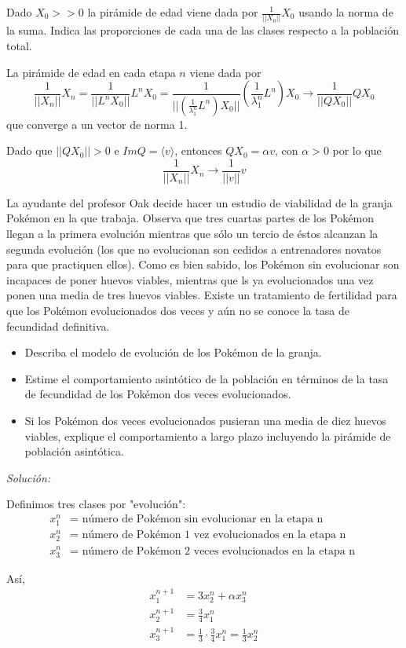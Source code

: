     Dado $X_0 >> 0$ la pirámide de edad viene dada por $\frac{1}{||X_0||}X_0$ usando la norma de la suma. Indica las proporciones de cada una de las clases respecto a la población total.

    La pirámide de edad en cada etapa $n$ viene dada por $$\frac{1}{||X_n||}X_n = \frac{1}{||L^nX_0||}L^nX_0 = \frac{1}{||(\frac{1}{\lambda_1^n}L^n)X_0||}\left(\frac{1}{\lambda_1^n}L^n\right)X_0\rightarrow \frac{1}{||QX_0||}QX_0$$ que converge a un vector de norma 1.

    Dado que $||QX_0|| > 0$ e $Im Q = \langle v \rangle$, entonces $QX_0 = \alpha v$, con $\alpha >0$ por lo que $$\frac{1}{||X_n||}X_n \rightarrow \frac{1}{||v||}v$$


    \begin{ejemplo}
        La ayudante del profesor Oak decide hacer un estudio de viabilidad de la granja Pokémon en la que trabaja. Observa que tres cuartas partes de los Pokémon llegan a la primera evolución mientras que sólo un tercio de éstos alcanzan la segunda evolución (los que no evolucionan son cedidos a entrenadores novatos para que practiquen ellos). Como es bien sabido, los Pokémon sin evolucionar son incapaces de poner huevos viables, mientras que ls ya evolucionados una vez ponen una media de tres huevos viables. Existe un tratamiento de fertilidad para que los Pokémon evolucionados dos veces y aún no se conoce la tasa de fecundidad definitiva. \begin{itemize}
            \item Describa el modelo de evolución de los Pokémon de la granja.
            \item Estime el comportamiento asintótico de la población en términos de la tasa de fecundidad de los Pokémon dos veces evolucionados.
            \item Si los Pokémon dos veces evolucionados pusieran una media de diez huevos viables, explique el comportamiento a largo plazo incluyendo la pirámide de población asintótica.
        \end{itemize}

        \textit{Solución:}

        Definimos tres clases por "evolución":
        \begin{align*}
            x_1^n &= \text{ número de Pokémon sin evolucionar en la etapa n } \\
            x_2^n &= \text{ número de Pokémon 1 vez evolucionados en la etapa n } \\
            x_3^n &= \text{ número de Pokémon 2 veces evolucionados en la etapa n }
        \end{align*}

        Así, \begin{align*}
            x_1^{n+1} &= 3x_2^n + \alpha x_3^n \\
            x_2^{n+1} &= \frac{3}{4}x_1^{n} \\
            x_3^{n+1} &= \frac{1}{3}\cdot \frac{3}{4}x_1^n = \frac{1}{3}x_2^n
        \end{align*}
        \end{ejemplo}

